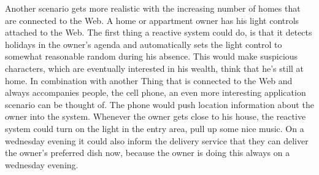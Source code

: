 Another scenario gets more realistic with the increasing number of homes that are connected to the Web.
A home or appartment owner has his light controls attached to the Web.
The first thing a reactive system could do, is that it detects holidays in the owner's agenda and automatically sets the light control to somewhat reasonable random during his absence.
This would make suspicious characters, which are eventually interested in his wealth, think that he's still at home.
In combination with another \textrm{Thing} that is connected to the Web and always accompanies people, the cell phone, an even more interesting application scenario can be thought of.
The phone would push location information about the owner into the system.
Whenever the owner gets close to his house, the reactive system could turn on the light in the entry area, pull up some nice music.
On a wednesday evening it could also inform the delivery service that they can deliver the owner's preferred dish now, because the owner is doing this always on a wednesday evening.



